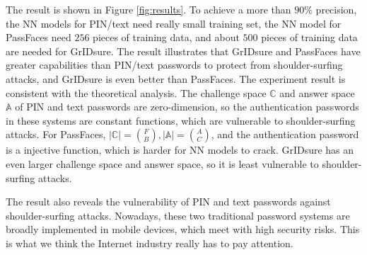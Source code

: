 \documentclass{article}
\begin{document}
  The result is shown in Figure \ref{fig:results}. To achieve a more than $90\%$ precision, the NN models for 
  PIN/text need really small training set, the NN model for PassFaces need $256$ pieces of training data, and 
  about $500$ pieces of training data are needed for GrIDsure. The result illustrates that GrIDsure and PassFaces 
  have greater capabilities than PIN/text passwords to protect from shoulder-surfing attacks, and GrIDsure 
  is even better than PassFaces. The experiment result is consistent with the theoretical analysis. The challenge space $\mathbb{C}$
  and answer space $\mathbb{A}$ of PIN and text passwords are zero-dimension, so the authentication passwords in these systems 
  are constant functions, which are vulnerable to shoulder-surfing attacks. For PassFaces, 
  $|\mathbb{C}| = \binom{F}{B}, |\mathbb{A}| = \binom{A}{C}$, and the authentication password is a injective function, which 
  is harder for NN models to crack. GrIDsure has an even larger challenge space and answer space, so it is least 
  vulnerable to shoulder-surfing attacks.
  
  The result also reveals the vulnerability of PIN and text passwords against shoulder-surfing attacks. Nowadays, 
  these two traditional password systems are broadly implemented in mobile devices, which meet with high security 
  risks. This is what we think the Internet industry really has to pay attention.
  
\end{document}
